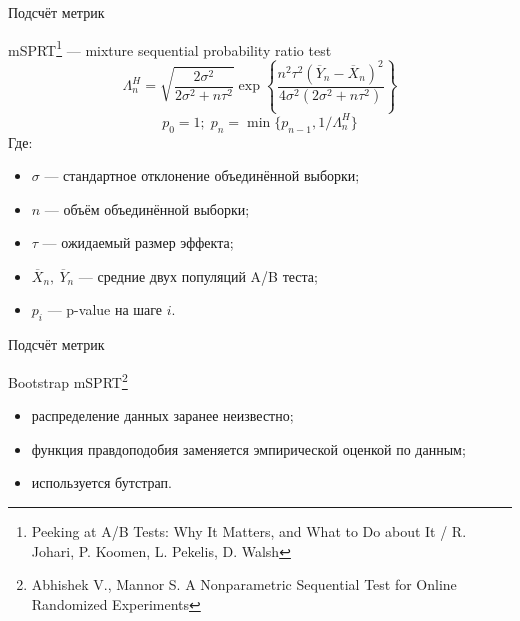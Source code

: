 \documentclass[12pt, unicode]{beamer}
\newif\ifmetropolis
\begin{document}
	\begin{frame}[fragile]{Подсчёт метрик}
		\begin{block}{mSPRT\footnote[1]{
			Peeking at A/B Tests: Why It Matters, and What to Do about It / R. Johari, P.
			Koomen, L. Pekelis, D. Walsh	
		} --- mixture sequential probability ratio test}
			\begin{equation}
				\label{eqn:mSPRT}
				\Lambda_{n}^{H} = \sqrt{\frac{2\sigma^2}{2\sigma^2 +n\tau^2}} \exp\left\{\frac{n^2\tau^2 (\overline{Y}_n-\overline{X}_n)^2}{4\sigma^2(2\sigma^2+n\tau^2)}\right\}
			\end{equation}
			\begin{equation}
				p_0=1;\;p_n=\min\{p_{n-1},1/\Lambda_{n}^{H}\}
			\end{equation}
			Где:
			\vspace*{-0.5cm}
			\begin{itemize}
				\item $\sigma$ --- стандартное отклонение объединённой выборки;
				\item $n$ --- объём объединённой выборки;
				\item $\tau$ --- ожидаемый размер эффекта;
				\item $\overline{X}_n,\ \overline{Y}_n$ --- средние двух популяций A/B теста;
				\item $p_i$ --- p-value на шаге $i$.
			\end{itemize}
			\vspace*{-0.5cm}
		\end{block}
		\vfill\null
	\end{frame}
	

	\begin{frame}[fragile]{Подсчёт метрик}
		\begin{block}{Bootstrap mSPRT\footnote[2]{
					Abhishek V., Mannor S. A Nonparametric Sequential Test for Online Randomized
Experiments
			}}
			\ifmetropolis
				\smallskip
			\fi
			\begin{itemize}
				\item распределение данных заранее неизвестно;
				\item функция правдоподобия заменяется эмпирической оценкой по данным;
				\item используется бутстрап.
			\end{itemize}
		\end{block}
		\vfill\null
	\end{frame}
\end{document}
